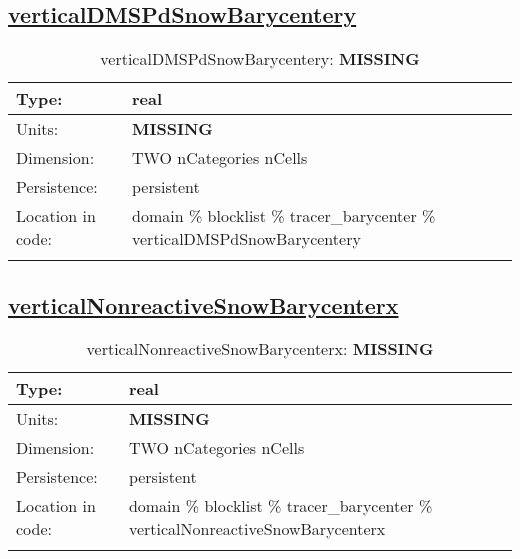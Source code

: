 \subsection[verticalDMSPdSnowBarycentery]{\hyperref[sec:var_tab_tracer_barycenter]{verticalDMSPdSnowBarycentery}}
\label{subsec:var_sec_tracer_barycenter_verticalDMSPdSnowBarycentery}
\begin{center}
\begin{longtable}{| p{2.0in} | p{4.0in} |}
        \hline 
        Type: & real \\
        \hline 
        Units: & {\bf \color{red} MISSING} \\
        \hline 
        Dimension: & TWO nCategories nCells \\
        \hline 
        Persistence: & persistent \\
        \hline 
         Location in code: & domain \% blocklist \% tracer\_barycenter \% verticalDMSPdSnowBarycentery \\
         \hline 
    \caption{verticalDMSPdSnowBarycentery: {\bf \color{red} MISSING}}
\end{longtable}
\end{center}
\subsection[verticalNonreactiveSnowBarycenterx]{\hyperref[sec:var_tab_tracer_barycenter]{verticalNonreactiveSnowBarycenterx}}
\label{subsec:var_sec_tracer_barycenter_verticalNonreactiveSnowBarycenterx}
\begin{center}
\begin{longtable}{| p{2.0in} | p{4.0in} |}
        \hline 
        Type: & real \\
        \hline 
        Units: & {\bf \color{red} MISSING} \\
        \hline 
        Dimension: & TWO nCategories nCells \\
        \hline 
        Persistence: & persistent \\
        \hline 
         Location in code: & domain \% blocklist \% tracer\_barycenter \% verticalNonreactiveSnowBarycenterx \\
         \hline 
    \caption{verticalNonreactiveSnowBarycenterx: {\bf \color{red} MISSING}}
\end{longtable}
\end{center}
